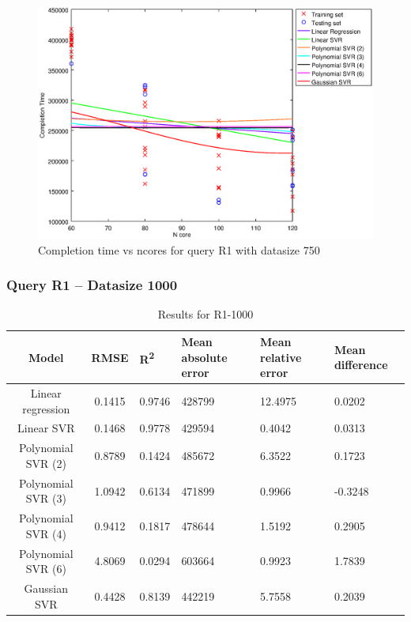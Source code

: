 \documentclass[a4paper,11pt]{article}
\begin{document}
\begin {figure}[hbtp]
\centering
\includegraphics[width=\textwidth]{output/R1_750_LINEAR_NCORE/plot_R1_750.eps}
\caption{Completion time vs ncores for query R1 with datasize 750}
\label{fig:all_linear_R1_750}
\end {figure}

\newpage
\subsubsection{Query R1 -- Datasize 1000}
\begin{table}[H]
	\centering
	\begin{adjustbox}{center}
		\begin{tabular}{c | c M{1.2cm} M{2.5cm} M{2.5cm} M{1.8cm}}
			Model & RMSE & R\textsuperscript{2} & Mean absolute error & Mean relative error & Mean difference \tabularnewline
			\hline
			Linear regression & 0.1415 & 0.9746 & 428799 & 12.4975 & 0.0202 \\
			Linear SVR & 0.1468 & 0.9778 & 429594 & 0.4042 & 0.0313 \\
			Polynomial SVR (2) & 0.8789 & 0.1424 & 485672 & 6.3522 & 0.1723 \\
			Polynomial SVR (3) & 1.0942 & 0.6134 & 471899 & 0.9966 & -0.3248 \\
			Polynomial SVR (4) & 0.9412 & 0.1817 & 478644 & 1.5192 & 0.2905 \\
			Polynomial SVR (6) & 4.8069 & 0.0294 & 603664 & 0.9923 & 1.7839 \\
			Gaussian SVR & 0.4428 & 0.8139 & 442219 & 5.7558 & 0.2039 \\
		\end{tabular}
	\end{adjustbox}
	\\
	\caption{Results for R1-1000}
	\label{fig:all_linear_R1_1000}
\end{table}
\end{document}
